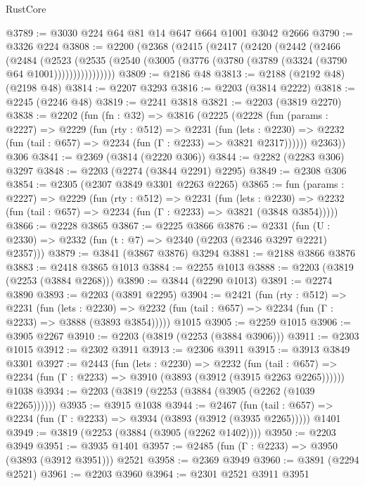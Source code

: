 \begin{lexlean}{RustCore}
\begin{coremodule}
@3789 := @3030 @224 @64 @81 @14 @647 @664 @1001 @3042 @2666
@3790 := @3326 @224
@3808 := @2200
    (@2368
      (@2415
        (@2417
          (@2420
            (@2442
              (@2466
                (@2484
                  (@2523
                    (@2535
                      (@2540 (@3005 (@3776 (@3780 (@3789 (@3324 (@3790 @64 @1001))))))))))))))))
@3809 := @2186 @48
@3813 := @2188 (@2192 @48) (@2198 @48)
@3814 := @2207 @3293
@3816 := @2203 (@3814 @2222)
@3818 := @2245 (@2246 @48)
@3819 := @2241 @3818
@3821 := @2203 (@3819 @2270)
@3838 := @2202
    (fun (fn : @32) =>
    @3816
      (@2225
        (@2228
          (fun (params : @2227) =>
          @2229
            (fun (rty : @512) =>
            @2231
              (fun (lets : @2230) =>
              @2232 (fun (tail : @657) => @2234 (fun (Γ : @2233) => @3821 @2317))))))
        @2363))
    @306
@3841 := @2369 (@3814 (@2220 @306))
@3844 := @2282 (@2283 @306) @3297
@3848 := @2203 (@2274 (@3844 @2291) @2295)
@3849 := @2308 @306
@3854 := @2305 (@2307 @3849 @3301 @2263 @2265)
@3865 := fun (params : @2227) =>
  @2229
    (fun (rty : @512) =>
    @2231
      (fun (lets : @2230) =>
      @2232 (fun (tail : @657) => @2234 (fun (Γ : @2233) => @3821 (@3848 @3854)))))
@3866 := @2228 @3865
@3867 := @2225 @3866
@3876 := @2331 (fun (U : @2330) => @2332 (fun (t : @7) => @2340 (@2203 (@2346 @3297 @2221) @2357)))
@3879 := @3841 (@3867 @3876) @3294
@3881 := @2188 @3866 @3876
@3883 := @2418 @3865 @1013
@3884 := @2255 @1013
@3888 := @2203 (@3819 (@2253 (@3884 @2268)))
@3890 := @3844 (@2290 @1013)
@3891 := @2274 @3890
@3893 := @2203 (@3891 @2295)
@3904 := @2421
    (fun (rty : @512) =>
    @2231
      (fun (lets : @2230) =>
      @2232 (fun (tail : @657) => @2234 (fun (Γ : @2233) => @3888 (@3893 @3854)))))
    @1015
@3905 := @2259 @1015
@3906 := @3905 @2267
@3910 := @2203 (@3819 (@2253 (@3884 @3906)))
@3911 := @2303 @1015
@3912 := @2302 @3911
@3913 := @2306 @3911
@3915 := @3913 @3849 @3301
@3927 := @2443
    (fun (lets : @2230) =>
    @2232
      (fun (tail : @657) => @2234 (fun (Γ : @2233) => @3910 (@3893 (@3912 (@3915 @2263 @2265))))))
    @1038
@3934 := @2203 (@3819 (@2253 (@3884 (@3905 (@2262 (@1039 @2265))))))
@3935 := @3915 @1038
@3944 := @2467
    (fun (tail : @657) => @2234 (fun (Γ : @2233) => @3934 (@3893 (@3912 (@3935 @2265)))))
    @1401
@3949 := @3819 (@2253 (@3884 (@3905 (@2262 @1402))))
@3950 := @2203 @3949
@3951 := @3935 @1401
@3957 := @2485 (fun (Γ : @2233) => @3950 (@3893 (@3912 @3951))) @2521
@3958 := @2369 @3949
@3960 := @3891 (@2294 @2521)
@3961 := @2203 @3960
@3964 := @2301 @2521 @3911 @3951

\end{coremodule}
\end{lexlean}
